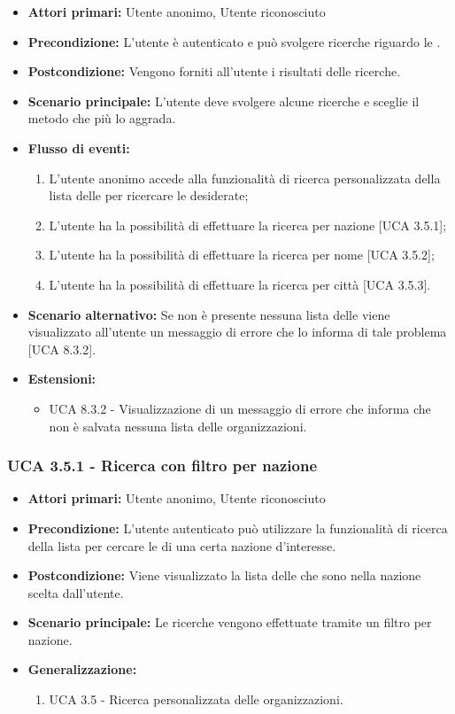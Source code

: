 \begin{itemize}
	\item \textbf{Attori primari:} Utente anonimo, Utente riconosciuto
	\item \textbf{Precondizione:} L'utente è autenticato e può svolgere ricerche riguardo le .
	\item \textbf{Postcondizione:} Vengono forniti all'utente i risultati delle ricerche.
	\item \textbf{Scenario principale:} L'utente deve svolgere alcune ricerche e sceglie il metodo che più lo aggrada.
	\item \textbf{Flusso di eventi:} 
	\begin{enumerate}
		\item L'utente anonimo accede alla funzionalità di ricerca personalizzata della lista delle  per ricercare le  desiderate;
		\item L'utente ha la possibilità di effettuare la ricerca per nazione [UCA 3.5.1];
		\item L'utente ha la possibilità di effettuare la ricerca per nome [UCA 3.5.2];
		\item L'utente ha la possibilità di effettuare la ricerca per città [UCA 3.5.3].
	\end{enumerate}
	\item \textbf{Scenario alternativo:} Se non è presente nessuna lista delle  viene visualizzato all'utente un messaggio di errore che lo informa di tale problema [UCA 8.3.2].
	\item \textbf{Estensioni:}
	\begin{itemize}
		\item UCA 8.3.2 - Visualizzazione di un messaggio di errore che informa che non è salvata nessuna lista delle organizzazioni.
	\end{itemize}
\end{itemize}

\subsubsection{UCA 3.5.1 - Ricerca con filtro per nazione}%
\begin{itemize}
	\item \textbf{Attori primari:} Utente anonimo, Utente riconosciuto
	\item \textbf{Precondizione:} L'utente autenticato può utilizzare la funzionalità di ricerca della lista per cercare le  di una certa nazione d'interesse.
	\item \textbf{Postcondizione:} Viene visualizzato la lista delle  che sono nella nazione scelta dall'utente.
	\item \textbf{Scenario principale:} Le ricerche vengono effettuate tramite un filtro per nazione.
	\item \textbf{Generalizzazione:}
	\begin{enumerate}
	\item UCA 3.5 - Ricerca personalizzata delle organizzazioni.
	\end{enumerate}	
\end{itemize}

